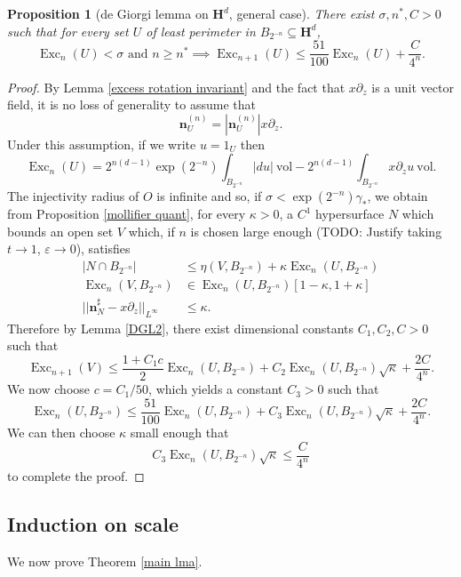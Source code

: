 \documentclass[reqno,12pt,letterpaper]{amsart}
\newcommand{\Hyp}{\mathbf H}
\DeclareMathOperator{\Exc}{Exc}
\newcommand{\normal}{\mathbf n}
\newcommand{\vol}{\mathrm{vol}}
\newtheorem{proposition}[theorem]{Proposition}
\theoremstyle{definition}
\numberwithin{equation}{section}
\begin{document}
\begin{proposition}[de Giorgi lemma on $\Hyp^d$, general case]\label{DGL 3}
There exist $\sigma, n^*, C > 0$ such that for every set $U$ of least perimeter in $B_{2^{-n}} \subseteq \Hyp^d$,
$$\Exc_n(U) < \sigma \text{ and } n \geq n^* \implies \Exc_{n+1}(U) \leq \frac{51}{100} \Exc_n(U) + \frac{C}{4^n}.$$
\end{proposition}
\begin{proof}
By Lemma \ref{excess rotation invariant} and the fact that $x\partial_z$ is a unit vector field, it is no loss of generality to assume that
$$\normal^{(n)}_U = |\normal^{(n)}_U| x\partial_z.$$
Under this assumption, if we write $u = 1_U$ then
$$\Exc_n(U) = 2^{n(d - 1)} \exp(2^{-n}) \int_{B_{2^{-n}}} |du| ~\vol - 2^{n(d - 1)} \int_{B_{2^{-n}}} x\partial_z u ~\vol.$$
The injectivity radius of $O$ is infinite and so, if $\sigma < \exp(2^{-n}) \gamma_*$, we obtain from Proposition \ref{mollifier quant}, for every $\kappa > 0$, a $C^1$ hypersurface $N$ which bounds an open set $V$ which, if $n$ is chosen large enough (TODO: Justify taking $t \to 1$, $\varepsilon \to 0$), satisfies
\begin{align*}
|N \cap B_{2^{-n}}| &\leq \eta(V, B_{2^{-n}}) + \kappa \Exc_n(U, B_{2^{-n}}) \\
\Exc_n(V, B_{2^{-n}}) &\in \Exc_n(U, B_{2^{-n}})[1 - \kappa, 1 + \kappa] \\
||\normal^\sharp_N - x\partial_z||_{L^\infty} &\leq \kappa.
\end{align*}
Therefore by Lemma \ref{DGL2}, there exist dimensional constants $C_1,C_2,C > 0$ such that
$$\Exc_{n + 1}(V) \leq \frac{1 + C_1c}{2} \Exc_n(U, B_{2^{-n}}) + C_2 \Exc_n(U, B_{2^{-n}}) \sqrt \kappa + \frac{2C}{4^n}.$$
We now choose $c = C_1/50$, which yields a constant $C_3 > 0$ such that
$$\Exc_n(U, B_{2^{-n}}) \leq \frac{51}{100} \Exc_n(U, B_{2^{-n}}) + C_3 \Exc_n(U, B_{2^{-n}}) \sqrt \kappa + \frac{2C}{4^n}.$$
We can then choose $\kappa$ small enough that
$$C_3 \Exc_n(U, B_{2^{-n}}) \sqrt \kappa \leq \frac{C}{4^n}$$
to complete the proof.
\end{proof}


\subsection{Induction on scale}
We now prove Theorem \ref{main lma}.
\end{document}
